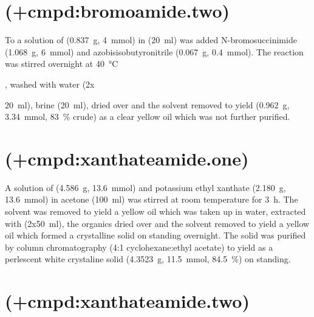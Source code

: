 {%

\section{ (\cmpd+{cmpd:bromoamide.two})}

To a solution of  (\SI{0.837}{\gram}, \SI{4}{\milli\mol}) in  (\SI{20}{\milli\litre}) was added N-bromosuccinimide (\SI{1.068}{\gram}, \SI{6}{\milli\mol}) and azobisisobutyronitrile (\SI{0.067}{\gram}, \SI{0.4}{\milli\mol}). The reaction was stirred overnight at \SI{40}{\celsius}}, washed with water (2x{\SI{20}{\milli\litre}), brine (\SI{20}{\milli\litre}), dried over  and the solvent removed \invacuo to yield  (\SI{0.962}{\gram}, \SI{3.34}{\milli\mol}, \SI{83}{\percent} crude) as a clear yellow oil which was not further purified.


\section{ (\cmpd+{cmpd:xanthateamide.one})}

A solution of  (\SI{4.586}{\gram}, \SI{13.6}{\milli\mol}) and potassium ethyl xanthate (\SI{2.180}{\gram}, \SI{13.6}{\milli\mol}) in acetone ({\SI{100}{\milli\litre}}) was stirred at room temperature for \SI{3}{\hour}. The solvent was removed \invacuo to yield a yellow oil which was taken up in water, extracted with  (2x\SI{50}{\milli\litre}), the organics dried over  and the solvent removed \invacuo to yield a yellow oil which formed a crystalline solid on standing overnight. The solid was purified by column chromatography (4:1 cyclohexane:ethyl acetate) to yield  as a perlescent white crystaline solid (\SI{4.3523}{\gram}, \SI{11.5}{\milli\mol}, \SI{84.5}{\percent}) on standing.


\section{ (\cmpd+{cmpd:xanthateamide.two})}

}
